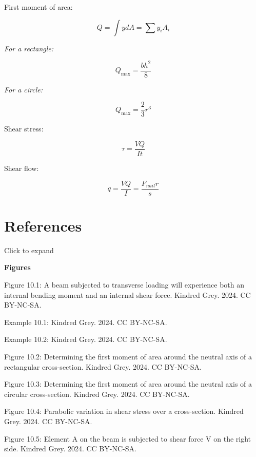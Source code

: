 \documentclass[
  letterpaper,
  DIV=11,
  numbers=noendperiod]{scrreprt}
\theoremstyle{definition}
\theoremstyle{remark}
\begin{document}
\begin{tcolorbox}[enhanced jigsaw, leftrule=.75mm, bottomrule=.15mm, opacityback=0, opacitybacktitle=0.6, colframe=quarto-callout-note-color-frame, toprule=.15mm, colbacktitle=quarto-callout-note-color!10!white, coltitle=black, bottomtitle=1mm, title={Key Equations}, titlerule=0mm, toptitle=1mm, colback=white, rightrule=.15mm, left=2mm, arc=.35mm, breakable]

First moment of area:

\[
Q=\int y d A=\sum y_i A_i
\]

\emph{For a rectangle:}

\[
Q_{\max }=\frac{b h^2}{8}
\]

\emph{For a circle:}

\[
Q_{\max }=\frac{2}{3} r^3
\]

Shear stress:

\[
\tau=\frac{V Q}{I t}
\]

Shear flow:

\[
q=\frac{V Q}{I}=\frac{F_{nail} r}{s}
\]

\end{tcolorbox}

\section*{References}\label{references-9}


Click to expand

\textbf{Figures}

Figure 10.1: A beam subjected to transverse loading will experience both
an internal bending moment and an internal shear force. Kindred Grey.
2024. CC BY-NC-SA.

Example 10.1: Kindred Grey. 2024. CC BY-NC-SA.

Example 10.2: Kindred Grey. 2024. CC BY-NC-SA.

Figure 10.2: Determining the first moment of area around the neutral
axis of a rectangular cross-section. Kindred Grey. 2024. CC BY-NC-SA.

Figure 10.3: Determining the first moment of area around the neutral
axis of a circular cross-section. Kindred Grey. 2024. CC BY-NC-SA.

Figure 10.4: Parabolic variation in shear stress over a cross-section.
Kindred Grey. 2024. CC BY-NC-SA.

Figure 10.5: Element A on the beam is subjected to shear force V on the
right side. Kindred Grey. 2024. CC BY-NC-SA.
\end{document}
